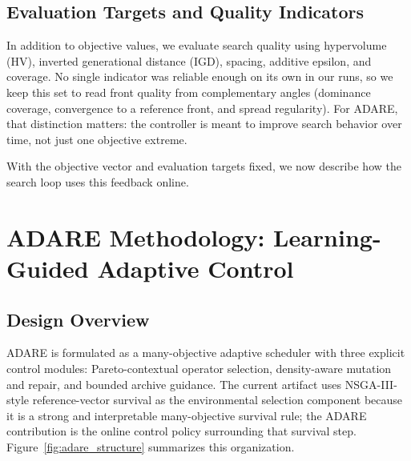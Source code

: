 \documentclass[runningheads]{llncs}
\begin{document}
\subsection{Evaluation Targets and Quality Indicators}
In addition to objective values, we evaluate search quality using hypervolume (HV), inverted generational distance (IGD), spacing, additive epsilon, and coverage. No single indicator was reliable enough on its own in our runs, so we keep this set to read front quality from complementary angles (dominance coverage, convergence to a reference front, and spread regularity). For ADARE, that distinction matters: the controller is meant to improve search behavior over time, not just one objective extreme.

With the objective vector and evaluation targets fixed, we now describe how the search loop uses this feedback online.

\section{ADARE Methodology: Learning-Guided Adaptive Control}
\subsection{Design Overview}
ADARE is formulated as a many-objective adaptive scheduler with three explicit control modules: Pareto-contextual operator selection, density-aware mutation and repair, and bounded archive guidance. The current artifact uses NSGA-III-style reference-vector survival as the environmental selection component because it is a strong and interpretable many-objective survival rule; the ADARE contribution is the online control policy surrounding that survival step. Figure~\ref{fig:adare_structure} summarizes this organization.
\end{document}
